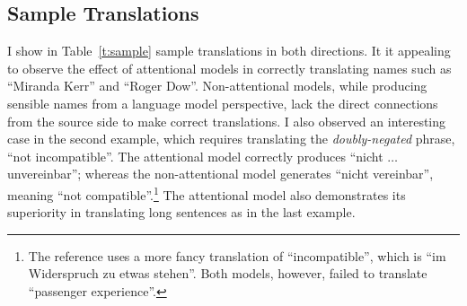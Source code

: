 \subsection{Sample Translations}
\label{sec:sample}
I show in Table~\ref{t:sample} sample translations in both directions. It it
appealing to observe the effect of attentional models in correctly translating
names such as ``Miranda Kerr'' and ``Roger Dow''. Non-attentional models, while producing sensible names from a language
model perspective, lack the direct connections from the source side to make
correct translations. %
I also observed an interesting case in the second
example, which requires translating the {\it doubly-negated} phrase, ``not incompatible''.
The attentional model correctly produces ``nicht $\dots$ unvereinbar'';
whereas the non-attentional model generates ``nicht vereinbar'', meaning
``not compatible''.\footnote{The reference uses a more fancy translation of
``incompatible'', which is ``im Widerspruch zu etwas stehen''. Both models, however, failed to translate ``passenger
experience''.} The attentional
model also demonstrates its superiority in translating long sentences as in
the last example.
